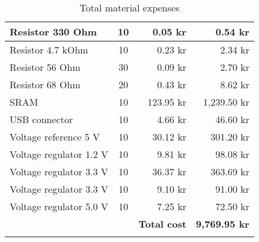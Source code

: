 \begin{longtable}{|l|c|r|r|}
    Resistor 330 Ohm        & 10     & 0.05 kr    & 0.54 kr     \\ \hline
    Resistor 4.7 kOhm       & 10     & 0.23 kr    & 2.34 kr     \\ \hline
    Resistor 56 Ohm         & 30     & 0.09 kr    & 2.70 kr     \\ \hline
    Resistor 68 Ohm         & 20     & 0.43 kr    & 8.62 kr     \\ \hline
    SRAM                    & 10     & 123.95 kr  & 1,239.50 kr \\ \hline
    USB connector           & 10     & 4.66 kr    & 46.60 kr    \\ \hline
    Voltage reference 5 V   & 10     & 30.12 kr   & 301.20 kr   \\ \hline
    Voltage regulator 1.2 V & 10     & 9.81 kr    & 98.08 kr    \\ \hline
    Voltage regulator 3.3 V & 10     & 36.37 kr   & 363.69 kr   \\ \hline
    Voltage regulator 3.3 V & 10     & 9.10 kr    & 91.00 kr    \\ \hline
    Voltage regulator 5.0 V & 10     & 7.25 kr    & 72.50 kr    \\ \hline \hline
    ~                       & ~      & \textbf{Total cost} & \textbf{9,769.95 kr} \\ \hline \hline
\caption{Total material expenses}
\end{longtable}
